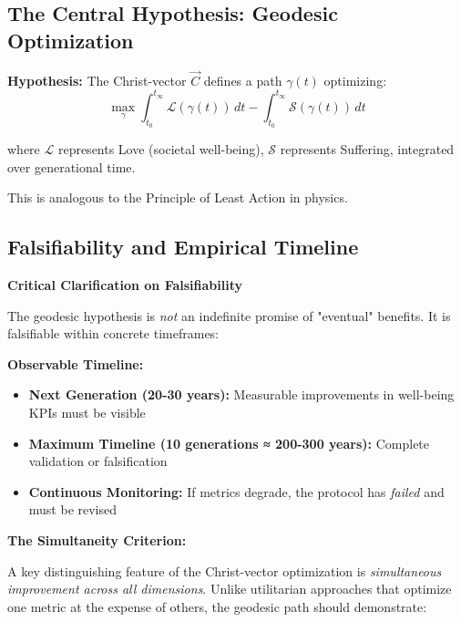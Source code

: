 \documentclass[11pt,a4paper]{article}
\theoremstyle{definition}
\theoremstyle{remark}
\begin{document}
\begin{small}
\subsection{The Central Hypothesis: Geodesic Optimization}

\begin{mdframed}[backgroundcolor=green!5]
\textbf{Hypothesis:} The Christ-vector $\vec{C}$ defines a path $\gamma(t)$ optimizing:
\begin{equation}
\max_{\gamma} \int_{t_0}^{t_{\infty}} \mathcal{L}(\gamma(t)) \, dt - \int_{t_0}^{t_{\infty}} \mathcal{S}(\gamma(t)) \, dt
\label{eq:geodesic}
\end{equation}

where $\mathcal{L}$ represents Love (societal well-being), $\mathcal{S}$ represents Suffering, integrated over generational time.

This is analogous to the Principle of Least Action in physics.
\end{mdframed}

\subsection{Falsifiability and Empirical Timeline}

\begin{mdframed}[backgroundcolor=yellow!10]
\textbf{Critical Clarification on Falsifiability}

The geodesic hypothesis is \textit{not} an indefinite promise of "eventual" benefits. It is falsifiable within concrete timeframes:

\textbf{Observable Timeline:}
\begin{itemize}
\item \textbf{Next Generation (20-30 years):} Measurable improvements in well-being KPIs must be visible
\item \textbf{Maximum Timeline (10 generations ≈ 200-300 years):} Complete validation or falsification
\item \textbf{Continuous Monitoring:} If metrics degrade, the protocol has \textit{failed} and must be revised
\end{itemize}

\textbf{The Simultaneity Criterion:}

A key distinguishing feature of the Christ-vector optimization is \textit{simultaneous improvement across all dimensions}. Unlike utilitarian approaches that optimize one metric at the expense of others, the geodesic path should demonstrate:


\end{mdframed}
\end{small}
\end{document}

